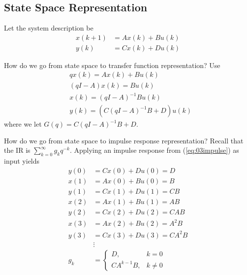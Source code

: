 \documentclass[lecture,12pt,]{pcms-l}
\begin{document}
\subsection{State Space Representation}
Let the system description be
\begin{align*}
x(k+1) &= Ax(k) + Bu(k) \\
y(k) &= Cx(k) + Du(k)
\end{align*}

How do we go from state space to transfer function representation? Use
\begin{align*}
&qx(k) = Ax(k) + Bu(k) \\
&(qI-A)x(k) = Bu(k) \\
&x(k) = (qI-A)^{-1}Bu(k) \\
&y(k) = (C(qI-A)^{-1}B+D)u(k)
\end{align*}
where we let $G(q) = C(qI-A)^{-1}B+D$.

How do we go from state space to impulse response representation? Recall that the IR is $\sum_{k=0}^\infty g_kq^{-k}$. Applying an impulse response from (\ref{eq:03impulse}) as input yields
\begin{align*}
y(0) &= Cx(0) + Du(0) = D \\
x(1) &= Ax(0) + Bu(0) = B \\
y(1) &= Cx(1) + Du(1) = CB \\
x(2) &= Ax(1) + Bu(1) = AB \\
y(2) &= Cx(2) + Du(2) = CAB \\
x(3) &= Ax(2) + Bu(2) = A^2B \\
y(3) &= Cx(3) + Du(3) = CA^2B \\
&\vdots \\
g_k &= \begin{cases} D, & k=0 \\ CA^{k-1}B, & k\neq 0 \end{cases}
\end{align*}
\end{document}
